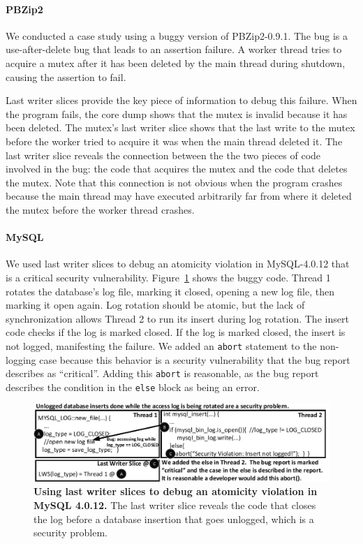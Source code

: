 \documentclass[preprint,9pt]{sigplanconf}
\begin{document}
\paragraph{PBZip2}
We conducted a case study using a buggy version of PBZip2-0.9.1.    The bug is
a use-after-delete bug that leads to an assertion failure.  A worker thread
tries to acquire a mutex after it has been deleted by the main thread during
shutdown, causing the assertion to fail.  

Last writer slices provide the key piece of information to debug this failure.
When the program fails, the core dump shows that the mutex is invalid because
it has been deleted.  The mutex's last writer slice shows that the last write
to the mutex before the worker tried to acquire it was when the main thread
deleted it.  The last writer slice reveals the connection between the the two
pieces of code involved in the bug: the code that acquires the mutex and the
code that deletes the mutex.  Note that this connection is not obvious when the
program crashes because the main thread may have executed arbitrarily far from
where it deleted the mutex before the worker thread crashes.  

\paragraph{MySQL}

We used last writer slices to debug an atomicity violation in MySQL-4.0.12 that
is a critical security vulnerability.  Figure~\ref{fig:mysqllws} shows the
buggy code.  Thread 1 rotates the database's log file, marking it closed,
opening a new log file, then marking it open again.  Log rotation should be
atomic, but the lack of synchronization allows Thread 2 to run its insert
during log rotation.  The insert code checks if the log is marked closed. If
the log is marked closed, the insert is not logged, manifesting the failure.
We added an {\tt abort} statement to the non-logging case because this behavior
is a security vulnerability that the bug report describes as ``critical''.
Adding this {\tt abort} is reasonable, as the bug report describes the
condition in the {\tt else} block as being an error.

\begin{figure}[h]
\centering
\includegraphics[width=\columnwidth]{figs/MySQLDebug.pdf}
\caption{\label{fig:mysqllws}{\bf Using last writer slices to debug an
atomicity violation in MySQL 4.0.12.} The last writer slice reveals the code that closes the log before a database insertion that goes unlogged, which is a security problem.}
\end{figure}
\end{document}

